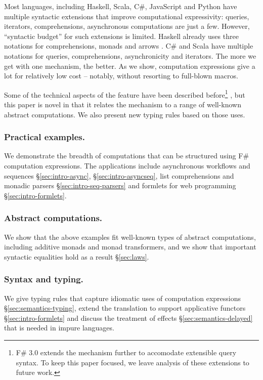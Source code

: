 \documentclass[runningheads,a4paper]{llncs}
\begin{document}
Most languages, including Haskell, Scala, C\#, JavaScript and Python have multiple
syntactic extensions that improve computational expressivity: queries, 
iterators, comprehensions, asynchronous computations are just a few. However,
``syntactic budget'' for such extensions is limited. Haskell already uses three notations
for comprehensions, monads and arrows \cite{arrows}. C\# and Scala have multiple notations
for queries, comprehensions, asynchronicity and iterators. The more we get with one 
mechanism, the better. As we show, computation expressions give a lot for relatively 
low cost -- notably, without resorting to full-blown macros.

Some of the technical aspects of the feature have been described before\footnote{F\# 3.0 extends the 
mechanism further to accomodate extensible query syntax. To keep this paper focused, we leave analysis 
of these extensions to future work.} \cite{fsharp-spec}, but this paper is novel in that it relates the mechanism to 
a range of well-known abstract computations. We also present new typing rules based on those uses.

\vspace{-1em}
\subsubsection{Practical examples.} 
We demonstrate the breadth of computations that can be structured using F\# computation expressions.
The applications include asynchronous workflows and sequences \S\ref{sec:intro-async}, 
\S\ref{sec:intro-asyncseq}, list comprehensions and monadic parsers \S\ref{sec:intro-seq-parsers}
and formlets for web programming \S\ref{sec:intro-formlets}.

\vspace{-1em}
\subsubsection{Abstract computations.} We show that the above examples fit well-known types
of abstract computations, including additive monads and monad transformers, and we show that 
important syntactic equalities hold as a result \S\ref{sec:laws}.

\vspace{-1em}
\subsubsection{Syntax and typing.} We give typing rules that capture idiomatic uses of computation
expressions \S\ref{sec:semantics-typing}, extend the translation to support applicative functors 
\S\ref{sec:intro-formlets} and discuss the treatment of effects \S\ref{sec:semantics-delayed} that 
is needed in impure languages.
\end{document}
